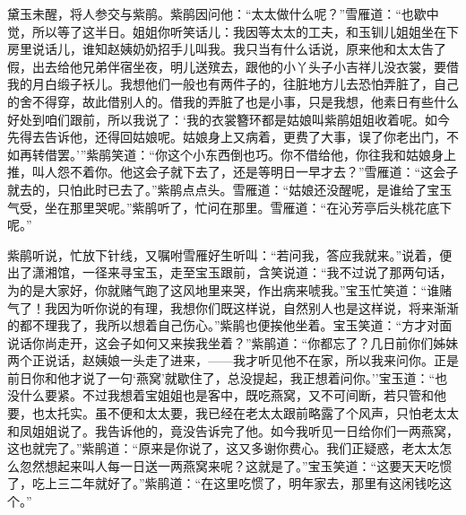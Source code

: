 黛玉未醒，将人参交与紫鹃。紫鹃因问他：``太太做什么呢？''雪雁道：``也歇中觉，所以等了这半日。姐姐你听笑话儿：我因等太太的工夫，和玉钏儿姐姐坐在下房里说话儿，谁知赵姨奶奶招手儿叫我。我只当有什么话说，原来他和太太告了假，出去给他兄弟伴宿坐夜，明儿送殡去，跟他的小丫头子小吉祥儿没衣裳，要借我的月白缎子袄儿。我想他们一般也有两件子的，往脏地方儿去恐怕弄脏了，自己的舍不得穿，故此借别人的。借我的弄脏了也是小事，只是我想，他素日有些什么好处到咱们跟前，所以我说了：`我的衣裳簪环都是姑娘叫紫鹃姐姐收着呢。如今先得去告诉他，还得回姑娘呢。姑娘身上又病着，更费了大事，误了你老出门，不如再转借罢。'''紫鹃笑道：``你这个小东西倒也巧。你不借给他，你往我和姑娘身上推，叫人怨不着你。他这会子就下去了，还是等明日一早才去？''雪雁道：``这会子就去的，只怕此时已去了。''紫鹃点点头。雪雁道：``姑娘还没醒呢，是谁给了宝玉气受，坐在那里哭呢。''紫鹃听了，忙问在那里。雪雁道：``在沁芳亭后头桃花底下呢。''

紫鹃听说，忙放下针线，又嘱咐雪雁好生听叫：``若问我，答应我就来。''说着，便出了潇湘馆，一径来寻宝玉，走至宝玉跟前，含笑说道：``我不过说了那两句话，为的是大家好，你就赌气跑了这风地里来哭，作出病来唬我。''宝玉忙笑道：``谁赌气了！我因为听你说的有理，我想你们既这样说，自然别人也是这样说，将来渐渐的都不理我了，我所以想着自己伤心。''紫鹃也便挨他坐着。宝玉笑道：``方才对面说话你尚走开，这会子如何又来挨我坐着？''紫鹃道：``你都忘了？几日前你们姊妹两个正说话，赵姨娘一头走了进来，------我才听见他不在家，所以我来问你。正是前日你和他才说了一句`燕窝'就歇住了，总没提起，我正想着问你。''宝玉道：``也没什么要紧。不过我想着宝姐姐也是客中，既吃燕窝，又不可间断，若只管和他要，也太托实。虽不便和太太要，我已经在老太太跟前略露了个风声，只怕老太太和凤姐姐说了。我告诉他的，竟没告诉完了他。如今我听见一日给你们一两燕窝，这也就完了。''紫鹃道：``原来是你说了，这又多谢你费心。我们正疑惑，老太太怎么忽然想起来叫人每一日送一两燕窝来呢？这就是了。''宝玉笑道：``这要天天吃惯了，吃上三二年就好了。''紫鹃道：``在这里吃惯了，明年家去，那里有这闲钱吃这个。''

